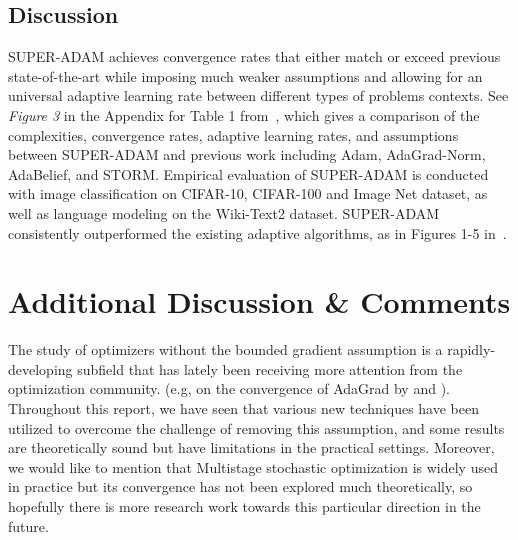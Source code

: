 \documentclass{article}
\begin{document}
\subsection{Discussion}
SUPER-ADAM achieves convergence rates that either match or exceed previous state-of-the-art while imposing much weaker assumptions and allowing for an universal adaptive learning rate between different types of problems contexts.
See \textit{Figure 3} in the Appendix for Table 1 from~\cite{https://doi.org/10.48550/arxiv.2106.08208}, which gives a comparison of the complexities, convergence rates, adaptive learning rates, and assumptions between SUPER-ADAM and previous work including Adam, AdaGrad-Norm, AdaBelief, and STORM.
Empirical evaluation of SUPER-ADAM is conducted with image classification on CIFAR-10, CIFAR-100 and Image Net dataset, as well as language modeling on the Wiki-Text2 dataset. SUPER-ADAM consistently outperformed the existing adaptive algorithms,
as in Figures 1-5 in~\cite{https://doi.org/10.48550/arxiv.2106.08208}.
\section{Additional Discussion \& Comments}
The study of optimizers without the bounded gradient assumption is a rapidly-developing subfield that has lately been receiving more attention from the optimization community. (e.g, on the convergence of AdaGrad by \cite{jin2022on} and \cite{https://doi.org/10.48550/arxiv.2202.05791}).
Throughout this report, we have seen that various new techniques have been utilized to overcome the challenge of removing this assumption, and some results are theoretically sound but have limitations in the practical settings. Moreover, we would like to mention that Multistage stochastic optimization is widely used in practice but its convergence has not been explored much theoretically, so hopefully there is more research work towards this particular direction in the future.
\newpage


%
\newpage
\appendix
\end{document}
